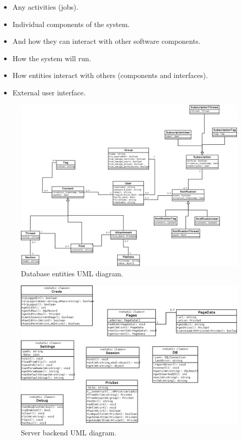 \documentclass[12pt]{report}
\begin{document}
                    \begin{itemize}
                        \item Any activities (jobs).
                        \item Individual components of the system.
                        \item And how they can interact with other software components.
                        \item How the system will run.
                        \item How entities interact with others (components and interfaces).
                        \item External user interface.
                    \end{itemize}
                    
                    \begin{figure}[H]
                    \caption{Database entities UML diagram.}
                    \centering
                    \includegraphics[width=1\textwidth]{uml/umldb}
                    \end{figure}

                    \newpage

                    \begin{figure}[H]
                    \caption{Server backend UML diagram.}
                    \centering
                    \includegraphics[width=1\textwidth]{uml/umlphp}
                    \end{figure}
\end{document}
